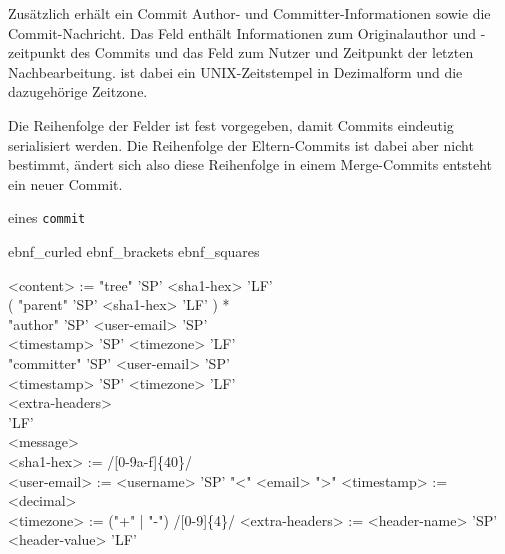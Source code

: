 \documentclass[
	nonacm,%
	screen,%
	sigplan,
]{acmart}
\newenvironment{myebnf}[1][4em]{%
	\begin{minipage}{.9\linewidth}%
		\expandafter \undef \csname ebnf_curled\endcsname
		\expandafter \undef \csname ebnf_brackets\endcsname
		\expandafter \undef \csname ebnf_squares\endcsname
		\begin{ebnf}[#1]%
}{%
		\end{ebnf}%
	\end{minipage}%
}
\begin{document}
Zusätzlich erhält ein Commit Author- und Committer-\hspace{0pt}Informationen sowie die Commit-Nachricht. Das Feld  enthält Informationen zum Originalauthor und -zeitpunkt des Commits und das Feld  zum Nutzer und Zeitpunkt der letzten Nachbearbeitung.  ist dabei ein UNIX-\hspace{0pt}Zeitstempel in Dezimalform und  die dazugehörige Zeitzone.

Die Reihenfolge der Felder ist fest vorgegeben, damit Commits eindeutig serialisiert werden. Die Reihenfolge der Eltern-Commits ist dabei aber nicht bestimmt, ändert sich also diese Reihenfolge in einem Merge-Commits entsteht ein neuer Commit.

\begin{format}
	\caption{ eines \texttt{commit}}%
	\label{commit-syntax}%
	\begin{myebnf}[7.5em]
		<content> := "tree" 'SP' <sha1-hex> 'LF' \\
		\null\hspace{7.5em} ( "parent" 'SP' <sha1-hex> 'LF' ) * \\
		\null\hspace{7.5em} "author" 'SP' <user-email> 'SP' \\
		\null\hspace{7.5em} <timestamp> 'SP' <timezone> 'LF' \\
		\null\hspace{7.5em} "committer" 'SP' <user-email> 'SP' \\
		\null\hspace{7.5em} <timestamp> 'SP' <timezone> 'LF' \\
		\null\hspace{7.5em} <extra-headers> \\
		\null\hspace{7.5em} 'LF' \\
		\null\hspace{7.5em} <message> \\
		<sha1-hex> := /[0-9a-f]\{40\}/ \\
		<user-email> := <username> 'SP' "<" <email> ">"
		<timestamp> := <decimal> \\
		<timezone> := ("+" | "-") /[0-9]\{4\}/
		<extra-headers> := <header-name> 'SP' \\
		\null\hspace{7.5em} <header-value> 'LF'
	\end{myebnf}
\end{format}
\end{document}
